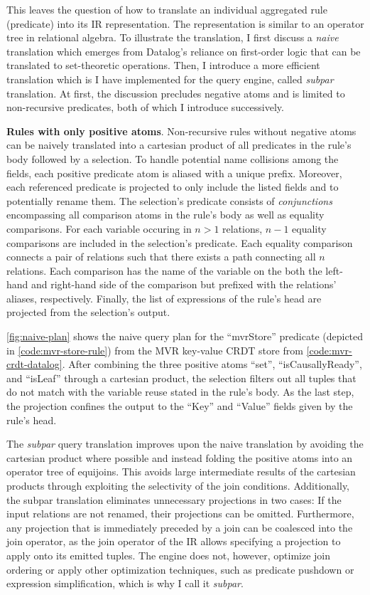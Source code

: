 This leaves the question of how to translate an individual aggregated rule
(predicate) into its \ac{IR} representation.
The representation is similar to an operator tree in relational algebra.
To illustrate the translation, I first discuss a \emph{naive} translation
which emerges from Datalog's reliance on first-order logic that can be
translated to set-theoretic operations.
Then, I introduce a more efficient translation which is I have implemented
for the query engine, called \emph{subpar} translation.
At first, the discussion precludes negative atoms and is limited to
non-recursive predicates, both of which I introduce successively.

\textbf{Rules with only positive atoms}.
Non-recursive rules without negative atoms can be naively translated
into a cartesian product of all predicates in the rule's body followed by
a selection.
To handle potential name collisions among the fields,
each positive predicate atom is aliased with a unique prefix.
Moreover, each referenced predicate is projected to only include the listed
fields and to potentially rename them.
The selection's predicate consists of \emph{conjunctions}
encompassing all comparison atoms in the rule's body as well as equality comparisons.
For each variable occuring in \(n > 1\) relations, \(n - 1\) equality comparisons
are included in the selection's predicate.
Each equality comparison connects a pair of relations such that there exists
a path connecting all \(n\) relations.
Each comparison has the name of the variable on the both the left-hand and right-hand
side of the comparison but prefixed with the relations' aliases, respectively.
Finally, the list of expressions of the rule's head are projected from the
selection's output.

\ref{fig:naive-plan} shows the naive query plan for the ``mvrStore'' predicate
(depicted in \ref{code:mvr-store-rule})
from the \ac{MVR} key-value \ac{CRDT} store from \ref{code:mvr-crdt-datalog}.
After combining the three positive atoms ``set'', ``isCausallyReady'', and
``isLeaf'' through a cartesian product, the selection filters out all tuples that
do not match with the variable reuse stated in the rule's body.
As the last step, the projection confines the output to the ``Key'' and ``Value''
fields given by the rule's head.

The \emph{subpar} query translation improves upon the naive translation
by avoiding the cartesian product where possible and instead folding the positive
atoms into an operator tree of equijoins.
This avoids large intermediate results of the cartesian products through
exploiting the selectivity of the join conditions.
Additionally, the subpar translation eliminates unnecessary projections
in two cases:
If the input relations are not renamed, their projections can be omitted.
Furthermore, any projection that is immediately preceded by a join can be
coalesced into the join operator, as the join operator of the \ac{IR}
allows specifying a projection to apply onto its emitted tuples.
The engine does not, however, optimize join ordering or apply other
optimization techniques, such as predicate pushdown or expression simplification,
which is why I call it \emph{subpar}.

